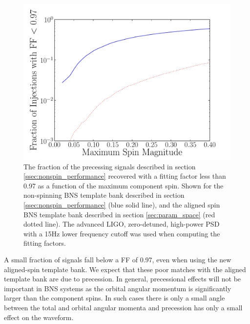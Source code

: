 \begin{figure}
\begin{center}
\includegraphics[width=1.0\textwidth]{papers/bns_spin/figure11.pdf}
\end{center}
\caption{\label{fig:anstar-st-spin} The fraction of the precessing signals described in
section \ref{ssec:nonspin_performance} recovered with a fitting factor less than 0.97 as
a function of the maximum component spin. Shown for the non-spinning
BNS template bank described in section \ref{ssec:nonspin_performance} (blue solid line),
and the aligned spin
BNS template bank described in section \ref{sec:param_space} (red dotted line). The advanced LIGO, zero-detuned,
high-power PSD with a 15Hz lower frequency cutoff was used when computing the fitting factors.}
\end{figure}

A small fraction of signals fall below a FF of 0.97, even when using the new aligned-spin template bank.
We expect that these poor matches with the aligned template bank are
due to precession. In general, precessional effects will not be important in BNS systems
as the orbital angular momentum is significantly larger than the component spins.
In such cases there is only a small angle between the total and orbital angular momenta
and precession has only a small effect on the waveform.

